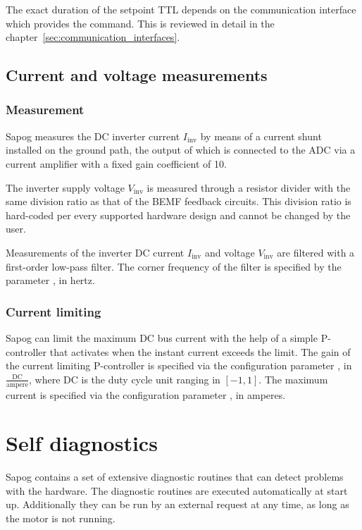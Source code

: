 \documentclass{zubaxdoc}
\begin{document}
The exact duration of the setpoint TTL depends on the communication interface which provides the command.
This is reviewed in detail in the chapter~\ref{sec:communication_interfaces}.

\subsection{Current and voltage measurements}

\subsubsection{Measurement}

Sapog measures the DC inverter current $I_\text{inv}$ by means of a current shunt installed on the ground path,
the output of which is connected to the ADC via a current amplifier with a fixed gain coefficient of 10.

The inverter supply voltage $V_\text{inv}$ is measured through a resistor divider with the same
division ratio as that of the BEMF feedback circuits.
This division ratio is hard-coded per every supported hardware design and cannot be changed by the user.

Measurements of the inverter DC current $I_\text{inv}$ and voltage $V_\text{inv}$
are filtered with a first-order low-pass filter.
The corner frequency of the filter is specified by the parameter , in hertz.

\subsubsection{Current limiting}\label{sec:current_limiting}

Sapog can limit the maximum DC bus current with the help of a simple P-controller
that activates when the instant current exceeds the limit.
The gain of the current limiting P-controller is specified via the configuration parameter
, in $\frac{\text{DC}}{\text{ampere}}$, where $\text{DC}$ is the duty cycle unit
ranging in $\left[-1, 1\right]$.
The maximum current is specified via the configuration parameter , in amperes.

\section{Self diagnostics}\label{sec:self_diagnostics}

Sapog contains a set of extensive diagnostic routines that can detect problems with the hardware.
The diagnostic routines are executed automatically at start up.
Additionally they can be run by an external request at any time, as long as the motor is not running.
\end{document}
